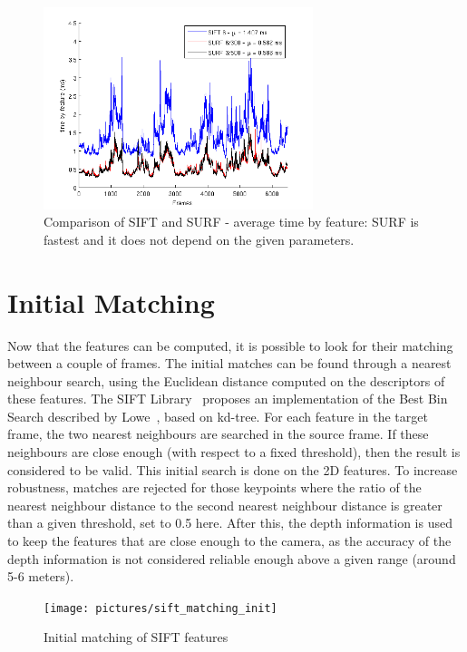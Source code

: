 \begin{figure}[H]
\begin{center}
\includegraphics[width=0.7\textwidth]{figures/stats_features_tbf}
\caption{Comparison of SIFT and SURF - average time by feature: SURF is fastest and it does not depend on the given parameters.}
\end{center}
\end{figure}

\clearpage
\section{Initial Matching}

Now that the features can be computed, it is possible to look for their matching between a couple of frames. The initial matches can be found through a nearest neighbour search, using the Euclidean distance computed on the descriptors of these features.  
The SIFT Library~\cite{hess_sift} proposes an implementation of the Best Bin Search described by Lowe~\cite{lowe_2004_sift}, based on kd-tree. For each feature in the target frame, the two nearest neighbours are searched in the source frame. If these neighbours are close enough (with respect to a fixed threshold), then the result is considered to be valid. This initial search is done on the 2D features. To increase robustness, matches are rejected for those keypoints where the ratio of the nearest neighbour distance to the second nearest neighbour distance is greater than a given threshold, set to 0.5 here. After this, the depth information is used to keep the features that are close enough to the camera, as the accuracy of the depth information is not considered reliable enough above a given range (around 5-6 meters).

\begin{figure}[H]
\centering
\texttt{[image: pictures/sift\_matching\_init]}
\caption{Initial matching of SIFT features}
\end{figure}

